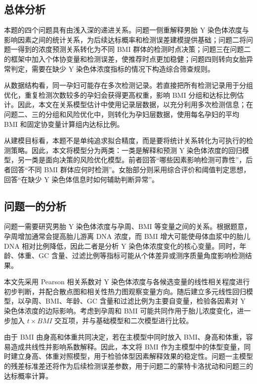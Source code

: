 \documentclass[UTF8,zihao=-4]{ctexart}
\numberwithin{equation}{section}
\begin{document}
\subsection{总体分析}

本题的四个问题具有由浅入深的递进关系。问题一侧重解释男胎 Y 染色体浓度与影响因素之间的统计关系，为后续达标概率和检测误差建模提供基础；问题二将问题一得到的浓度预测关系转化为不同 BMI 群体的检测时点决策；问题三在问题二的框架中加入个体协变量和检测误差，使推荐时点更加稳健；问题四则转向女胎异常判定，需要在缺少 Y 染色体浓度指标的情况下构造综合筛查规则。

从数据结构看，同一孕妇可能存在多次检测记录。若直接把所有检测记录用于分组优化，重复检测次数较多的孕妇会获得更高权重，影响 BMI 分组和达标比例估计。因此，本文在关系模型估计中使用记录层数据，以充分利用多次检测信息；在问题二、三的分组和风险优化中，则转化为孕妇层数据，使用每名孕妇的平均 BMI 和固定协变量计算组内达标比例。

从建模目标看，本题不是单纯追求拟合精度，而是要将统计关系转化为可执行的检测策略。因此，本文将模型分为两类：一类是解释和预测 Y 染色体浓度的回归模型，另一类是面向决策的风险优化模型。前者回答“哪些因素影响检测可靠性”，后者回答“不同 BMI 群体应何时检测”。女胎部分则采用综合评价和阈值判定思想，回答“在缺少 Y 染色体信息时如何辅助判断异常”。

\subsection{问题一的分析}

问题一需要研究男胎 Y 染色体浓度与孕周、BMI 等变量之间的关系。根据题意，孕周增加通常会提高胎儿游离 DNA 浓度，而 BMI 增大可能使母体血浆中的胎儿 DNA 相对比例降低，因此二者是分析 Y 染色体浓度变化的核心变量。同时，年龄、体重、GC 含量、过滤比例等指标可能从个体差异或测序质量角度影响检测结果。

本文先采用 Pearson 相关系数对 Y 染色体浓度与各候选变量的线性相关程度进行初步判断，并配合散点图和相关性热力图观察变量方向。随后建立多元线性回归模型，以孕周、BMI、年龄、GC 含量和过滤比例为主要自变量，检验各因素对 Y 染色体浓度的边际影响\cite{montgomery2012}。考虑到孕周和 BMI 可能共同作用于胎儿浓度变化，进一步加入 $t\times BMI$ 交互项，并与基础模型和二次模型进行比较。

由于 BMI 由身高和体重共同决定，若在主模型中同时放入 BMI、身高和体重，容易造成共线性并影响系数解释。因此，本文将 BMI 作为主模型中的体型变量，同时建立身高、体重对照模型，用于检验体型因素解释效果的稳定性。问题一主模型的残差标准差还将作为后续检测误差参数，用于问题二的蒙特卡洛扰动和问题三的达标概率计算。
\end{document}

